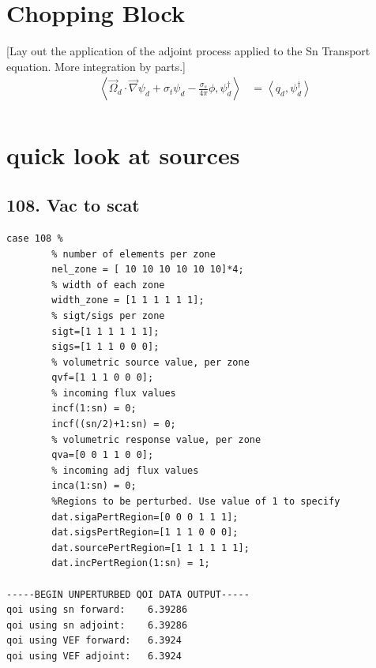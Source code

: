 \documentclass{article}
\newcommand{\vO}{\vec{\Omega}}
\newcommand{\bra}{\left\langle}
\newcommand{\ket}{\right\rangle}
\newcommand{\grad}{\vec{\nabla}}
\newcommand{\sigt}{\sigma_t}
\newcommand{\sigs}{\sigma_s}
\begin{document}
\section{Chopping Block}
[Lay out the application of the adjoint process applied to the Sn Transport equation. More integration by parts.]
\begin{equation}
\begin{split}
\bra \vO_d \cdot \grad \psi_d + \sigt \psi_d - \frac{\sigs}{4 \pi} \phi, \psi^\dag_d \ket &= \bra q_d , \psi^\dag_d \ket \\
\end{split}
\end{equation}



\section{quick look at sources}
\subsection{108. Vac to scat}
\begin{verbatim}
case 108 %
        % number of elements per zone
        nel_zone = [ 10 10 10 10 10 10]*4;
        % width of each zone
        width_zone = [1 1 1 1 1 1];
        % sigt/sigs per zone
        sigt=[1 1 1 1 1 1];
        sigs=[1 1 1 0 0 0];
        % volumetric source value, per zone
        qvf=[1 1 1 0 0 0];
        % incoming flux values
        incf(1:sn) = 0;
        incf((sn/2)+1:sn) = 0;
        % volumetric response value, per zone
        qva=[0 0 1 1 0 0];
        % incoming adj flux values
        inca(1:sn) = 0;
        %Regions to be perturbed. Use value of 1 to specify
        dat.sigaPertRegion=[0 0 0 1 1 1];
        dat.sigsPertRegion=[1 1 1 0 0 0];
        dat.sourcePertRegion=[1 1 1 1 1 1];
        dat.incPertRegion(1:sn) = 1; 
        
-----BEGIN UNPERTURBED QOI DATA OUTPUT----- 
qoi using sn forward: 	 6.39286 
qoi using sn adjoint: 	 6.39286 
qoi using VEF forward: 	 6.3924 
qoi using VEF adjoint: 	 6.3924 
\end{verbatim}
\end{document}
